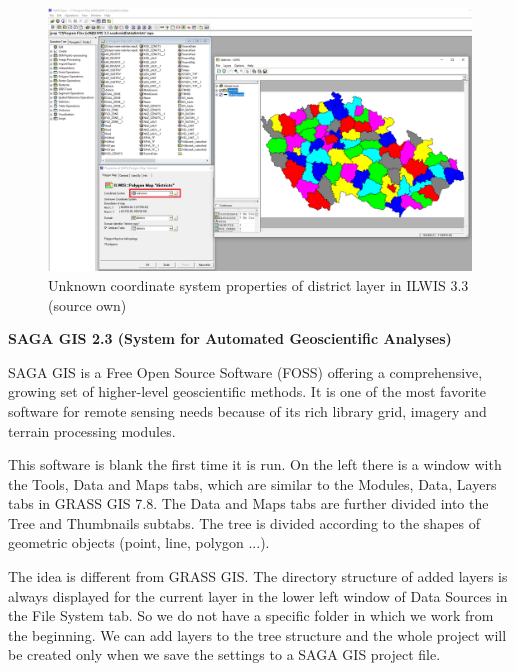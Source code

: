 \documentclass[a4paper,10pt,twoside]{article}
\begin{document}
\vspace{0.3cm}
\begin{figure}[hbt!] 
\begin{center}
\includegraphics[width=17cm]{../pictures/ilwis_pridani_mapy.png} 
\caption[Unknown coordinate system properties of district layer in ILWIS 3.3 (source own)]{Unknown coordinate system properties of district layer in ILWIS 3.3 (source own)}
\label{fig:ilwis_pridani_mapy}
\end{center}
\end{figure}

\bigskip

\noindent \textbf {SAGA GIS 2.3 (System for Automated Geoscientific Analyses)}

\noindent SAGA GIS is a Free Open Source Software (FOSS) offering a comprehensive, growing set of higher-level geoscientific methods. It is one of the most favorite software for remote sensing needs because of its rich library grid, imagery and terrain processing modules.

This software is blank the first time it is run. On the left there is a window with the Tools, Data and Maps tabs, which are similar to the Modules, Data, Layers tabs in GRASS GIS 7.8. The Data and Maps tabs are further divided into the Tree and Thumbnails subtabs. The tree is divided according to the shapes of geometric objects (point, line, polygon ...). 

The idea is different from GRASS GIS. The directory structure of added layers is always displayed for the current layer in the lower left window of Data Sources in the File System tab. So we do not have a specific folder in which we work from the beginning. We can add layers to the tree structure and the whole project will be created only when we save the settings to a SAGA GIS project file.
\end{document}

